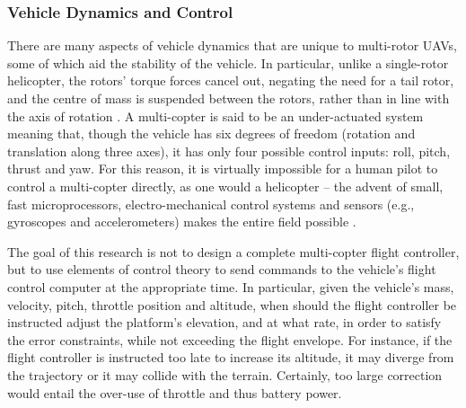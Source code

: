 




\subsubsection{Vehicle Dynamics and Control}

There are many aspects of vehicle dynamics that are unique to multi-rotor UAVs, some of which aid the stability of the vehicle. In particular, unlike a single-rotor helicopter, the rotors' torque forces cancel out, negating the need for a tail rotor, and the centre of mass is suspended between the rotors, rather than in line with the axis of rotation \cite{McKerrow2004}. A multi-copter is said to be an under-actuated system \cite{McKerrow2004,Mian2008,Valavanis2007} meaning that, though the vehicle has six degrees of freedom (rotation and translation along three axes), it has only four possible control inputs: roll, pitch, thrust and yaw. For this reason, it is virtually impossible for a human pilot to control a multi-copter directly, as one would a helicopter -- the advent of small, fast microprocessors, electro-mechanical control systems and sensors (e.g., gyroscopes and accelerometers) makes the entire field possible \cite{Hoffmann2007}. 


The goal of this research is not to design a complete multi-copter flight controller, but to use elements of control theory to send commands to the vehicle's flight control computer at the appropriate time. In particular, given the vehicle's mass, velocity, pitch, throttle position and altitude, when should the flight controller be instructed adjust the platform's elevation, and at what rate, in order to satisfy the error constraints, while not exceeding the flight envelope. For instance, if the flight controller is instructed too late to increase its altitude, it may diverge from the trajectory or it may collide with the terrain. Certainly, too large correction would entail the over-use of throttle and thus battery power.

